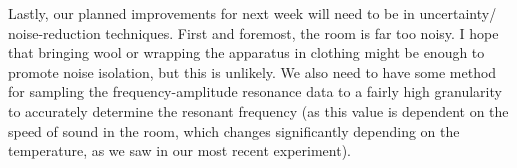\documentclass[14pt]{extarticle}
\begin{document}
Lastly, our planned improvements for next week will need to be in uncertainty/ noise-reduction techniques. First and foremost, the room is far too noisy. I hope that bringing wool or wrapping the apparatus in clothing might be enough to promote noise isolation, but this is unlikely. We also need to have some method for sampling the frequency-amplitude resonance data to a fairly high granularity to accurately determine the resonant frequency (as this value is dependent on the speed of sound in the room, which changes significantly depending on the temperature, as we saw in our most recent experiment).
\end{document}

